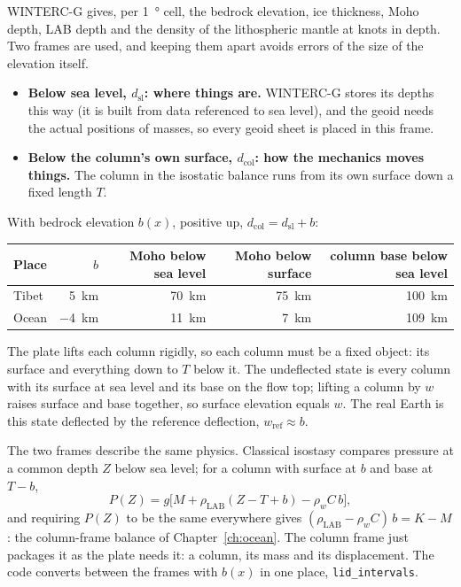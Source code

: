 WINTERC-G gives, per \qty{1}{\degree} cell, the bedrock elevation, ice thickness, Moho depth, LAB depth and the density of the lithospheric mantle at knots in depth.
Two frames are used, and keeping them apart avoids errors of the size of the elevation itself.
\begin{itemize}[nosep]
\item \textbf{Below sea level, $d_{\mathrm{sl}}$: where things are.} WINTERC-G stores its depths this way (it is built from data referenced to sea level), and the geoid needs the actual positions of masses, so every geoid sheet is placed in this frame.
\item \textbf{Below the column's own surface, $d_{\mathrm{col}}$: how the mechanics moves things.} The column in the isostatic balance runs from its own surface down a fixed length $T$.
\end{itemize}
With bedrock elevation $b(x)$, positive up, $d_{\mathrm{col}} = d_{\mathrm{sl}} + b$:
\begin{center}
\small
\begin{tabular}{lrrrr}
\toprule
Place & $b$ & Moho below sea level & Moho below surface & column base below sea level\\
\midrule
Tibet & \qty{+5}{km} & \qty{70}{km} & \qty{75}{km} & \qty{100}{km}\\
Ocean & \qty{-4}{km} & \qty{11}{km} & \qty{7}{km} & \qty{109}{km}\\
\bottomrule
\end{tabular}
\end{center}
The plate lifts each column rigidly, so each column must be a fixed object: its surface and everything down to $T$ below it.
The undeflected state is every column with its surface at sea level and its base on the flow top; lifting a column by $w$ raises surface and base together, so surface elevation equals $w$.
The real Earth is this state deflected by the reference deflection, $w_{\mathrm{ref}}\approx b$.

The two frames describe the same physics.
Classical isostasy compares pressure at a common depth $Z$ below sea level; for a column with surface at $b$ and base at $T-b$,
\[
    P(Z) = g\big[M + \rho_{\mathrm{LAB}}(Z - T + b) - \rho_w C\,b\big],
\]
and requiring $P(Z)$ to be the same everywhere gives $(\rho_{\mathrm{LAB}}-\rho_w C)\,b = K - M$: the column-frame balance of Chapter~\ref{ch:ocean}.
The column frame just packages it as the plate needs it: a column, its mass and its displacement.
The code converts between the frames with $b(x)$ in one place, \texttt{lid\_intervals}.

